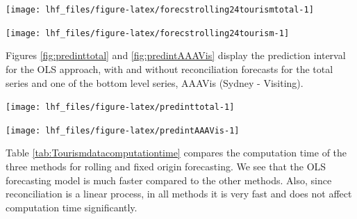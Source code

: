\documentclass[11pt,a4paper,]{article}
\let\origfigure\figure
\let\endorigfigure\endfigure
\renewenvironment{figure}[1][2] {
    \expandafter\origfigure\expandafter[!htbp]
} {
    \endorigfigure
}
\begin{document}
\begin{figure}

{\centering \texttt{[image: lhf\_files/figure-latex/forecstrolling24tourismtotal-1]} 

}

\caption{The actual test set for the 'Total series' compared to the forecasts from reconciled and unreconciled ETS, ARIMA and OLS methods for rolling and fixed origin tourism demand.}\label{fig:forecstrolling24tourismtotal}
\end{figure}

\begin{figure}

{\centering \texttt{[image: lhf\_files/figure-latex/forecstrolling24tourism-1]} 

}

\caption{The actual test set for the 'AAAVis' bottom level series compared to the forecasts from reconciled and unreconciled ETS, ARIMA and OLS methods for rolling and fixed origin tourism demand.}\label{fig:forecstrolling24tourism}
\end{figure}

Figures \ref{fig:predinttotal} and \ref{fig:predintAAAVis} display the prediction interval for the OLS approach, with and without reconciliation forecasts for the total series and one of the bottom level series, AAAVis (Sydney - Visiting).

\begin{figure}

{\centering \texttt{[image: lhf\_files/figure-latex/predinttotal-1]} 

}

\caption{The actual test set for the 'Total series' compared to the forecasts from reconciled ARIMA, ETS and OLS methods with prediction interval for rolling and fixed origin tourism demand.}\label{fig:predinttotal}
\end{figure}

\begin{figure}

{\centering \texttt{[image: lhf\_files/figure-latex/predintAAAVis-1]} 

}

\caption{The actual test set for the 'AAAVis' bottom level series compared to the forecasts from reconciled ARIMA, ETS and OLS methods with prediction interval for rolling and fixed origin tourism demand.}\label{fig:predintAAAVis}
\end{figure}

Table \ref{tab:Tourismdatacomputationtime} compares the computation time of the three methods for rolling and fixed origin forecasting. We see that the OLS forecasting model is much faster compared to the other methods. Also, since reconciliation is a linear process, in all methods it is very fast and does not affect computation time significantly.
\end{document}
